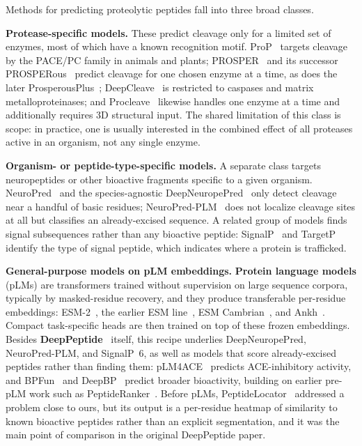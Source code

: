 \documentclass{article}
\begin{document}
Methods for predicting proteolytic peptides fall into three broad classes.

\textbf{Protease-specific models.} These predict cleavage only for a limited set of enzymes, most of which have a known recognition motif. ProP~\citep{duckert2004prop} targets cleavage by the PACE/PC family in animals and plants; PROSPER~\citep{song2012prosper} and its successor PROSPERous~\citep{song2018prosperous} predict cleavage for one chosen enzyme at a time, as does the later ProsperousPlus~\citep{li2023prosperousplus}; DeepCleave~\citep{li2020deepcleave} is restricted to caspases and matrix metalloproteinases; and Procleave~\citep{li2020procleave} likewise handles one enzyme at a time and additionally requires 3D structural input. The shared limitation of this class is scope: in practice, one is usually interested in the combined effect of all proteases active in an organism, not any single enzyme.

\textbf{Organism- or peptide-type-specific models.} A separate class targets neuropeptides or other bioactive fragments specific to a given organism. NeuroPred~\citep{southey2006neuropred} and the species-agnostic DeepNeuropePred~\citep{wang2024deepneuropepred} only detect cleavage near a handful of basic residues; NeuroPred-PLM~\citep{wang2023neuropredplm} does not localize cleavage sites at all but classifies an already-excised sequence. A related group of models finds signal subsequences rather than any bioactive peptide: SignalP~\citep{teufel2022signalp6} and TargetP~\citep{almagro2019targetp} identify the type of signal peptide, which indicates where a protein is trafficked.

\textbf{General-purpose models on pLM embeddings.} \textbf{Protein language models} (pLMs) are transformers trained without supervision on large sequence corpora, typically by masked-residue recovery, and they produce transferable per-residue embeddings: ESM-2~\citep{lin2023esm2}, the earlier ESM line~\citep{esm2_2019}, ESM Cambrian~\citep{esm_cambrian_blog_2024,ESM-family}, and Ankh~\citep{ankh2023}. Compact task-specific heads are then trained on top of these frozen embeddings. Besides \textbf{DeepPeptide}~\citep{deeppeptide2023} itself, this recipe underlies DeepNeuropePred, NeuroPred-PLM, and SignalP~6, as well as models that score already-excised peptides rather than finding them: pLM4ACE~\citep{du2024plm4ace} predicts ACE-inhibitory activity, and BPFun~\citep{bpfun2025} and DeepBP~\citep{zhang2024deepbp} predict broader bioactivity, building on earlier pre-pLM work such as PeptideRanker~\citep{mooney2012peptideranker}. Before pLMs, PeptideLocator~\citep{mooney2013peptidelocator} addressed a problem close to ours, but its output is a per-residue heatmap of similarity to known bioactive peptides rather than an explicit segmentation, and it was the main point of comparison in the original DeepPeptide paper.
\end{document}

